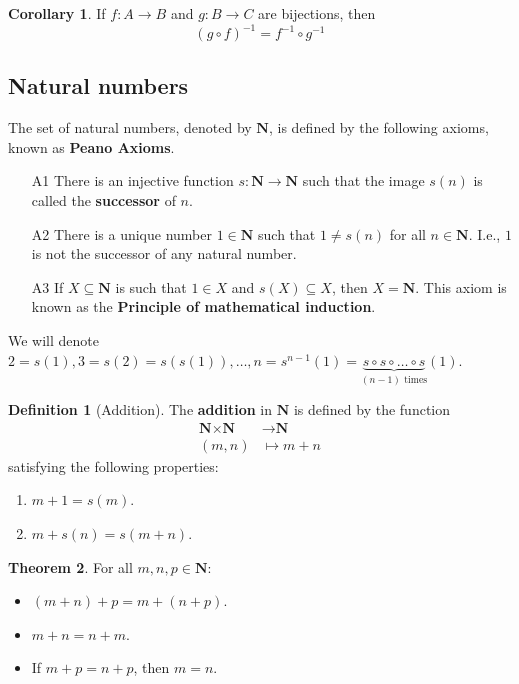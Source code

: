 \documentclass[tikz,12pt,a4paper]{article}
\theoremstyle{definition}
\newtheorem{theorem}{Theorem}[section]
\newtheorem{corollary}[theorem]{Corollary}
\newtheorem{definition}{Definition}[section]
\begin{document}
\begin{corollary}
	If $f : A \longrightarrow B$ and $g : B \longrightarrow C$ are bijections, then \[ (g \circ f)^{-1} = f^{-1} \circ g^{-1} \]
\end{corollary}

\subsection{Natural numbers}

The set of natural numbers, denoted by $\textbf{N}$, is defined by the following axioms, known as \textbf{Peano Axioms}.

\begin{enumerate}
	\item[A1] There is an injective function $s : \textbf{N} \longrightarrow \textbf{N}$ such that the image $s(n)$ is called the \textbf{successor} of $n$.
	\item[A2] There is a unique number $1 \in \textbf{N}$ such that $1 \neq s(n)$ for all $n \in \textbf{N}$. I.e., $1$ is not the successor of any natural number.
	\item[A3] If $X \subseteq \textbf{N}$ is such that $1 \in X$ and $s(X) \subseteq X$, then $X = \textbf{N}$. This axiom is known as the \textbf{Principle of mathematical induction}.
\end{enumerate}

We will denote $2 = s(1), 3 = s(2) = s(s(1)), \ldots, n = s^{n-1}(1) = \underbrace{s \circ s \circ \ldots \circ s}_{(n-1) \text{ times}}(1)$.

\begin{definition}[Addition]
	The \textbf{addition} in $\textbf{N}$ is defined by the function
	\begin{equation*}
		\begin{aligned}
			\textbf{N} \times \textbf{N} & \longrightarrow \textbf{N} \\
			(m,n) & \mapsto	m+n
		\end{aligned}
	\end{equation*}
	satisfying the following properties:
	\begin{enumerate}
		\item $m+1 = s(m)$.
		\item $m+s(n) = s(m+n)$.
	\end{enumerate}
\end{definition}

\begin{theorem}
	For all $m,n,p \in \textbf{N}$:
	\begin{itemize}
		\item $(m+n)+p = m+(n+p)$.
		\item $m+n = n+m$.
		\item If $m+p = n+p$, then $m = n$.
	\end{itemize}
\end{theorem}
\end{document}
